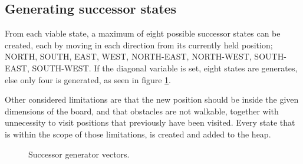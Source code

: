 \subsection{Generating successor states}
From each viable state, a maximum of eight possible successor states can be created, each by moving in each direction from its currently held position; NORTH, SOUTH, EAST, WEST, NORTH-EAST, NORTH-WEST, SOUTH-EAST, SOUTH-WEST. If the diagonal variable is set, eight states are generates, else only four is generated, as seen in figure \ref{code:succesor-generation}.

Other considered limitations are that the new position should be inside the given dimensions of the board, and that obstacles are not walkable, together with unnecessity to visit positions that previously have been visited. Every state that is within the scope of those limitations, is created and added to the heap. 

\begin{figure}[h!]
	\centering
	
	\caption{Successor generator vectors.}
	\label{code:succesor-generation}
\end{figure}

